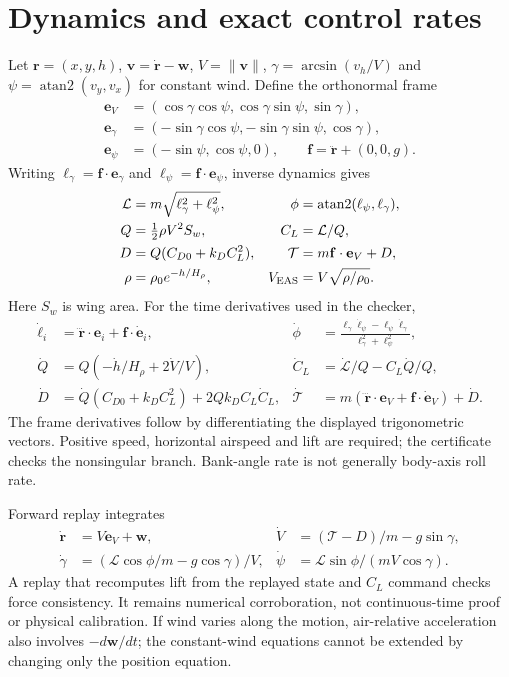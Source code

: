 \appendix
\section{Dynamics and exact control rates}\label{app:dynamics}
Let $\mathbf r=(x,y,h)$, $\mathbf v=\dot{\mathbf r}-\mathbf w$, $V=\|\mathbf v\|$, $\gamma=\arcsin(v_h/V)$ and $\psi=\operatorname{atan2}(v_y,v_x)$ for constant wind. Define the orthonormal frame
\begin{align}
\mathbf e_V&=(\cos\gamma\cos\psi,\cos\gamma\sin\psi,\sin\gamma),\\
\mathbf e_\gamma&=(-\sin\gamma\cos\psi,-\sin\gamma\sin\psi,\cos\gamma),\\
\mathbf e_\psi&=(-\sin\psi,\cos\psi,0),\qquad \mathbf f=\ddot{\mathbf r}+(0,0,g).
\end{align}
Writing $\ell_\gamma=\mathbf f\cdot\mathbf e_\gamma$ and $\ell_\psi=\mathbf f\cdot\mathbf e_\psi$, inverse dynamics gives
\begin{align}
\mathcal L&=m\sqrt{\ell_\gamma^2+\ell_\psi^2}, &\phi&=\operatorname{atan2}(\ell_\psi,\ell_\gamma),\\
Q&=\tfrac12\rho V^2S_w, & C_L&=\mathcal L/Q,\\
D&=Q(C_{D0}+k_D C_L^2), &\mathcal T&=m\mathbf f\cdot\mathbf e_V+D,\\
\rho&=\rho_0e^{-h/H_\rho}, &V_{\rm EAS}&=V\sqrt{\rho/\rho_0}.
\end{align}
Here $S_w$ is wing area. For the time derivatives used in the checker,
\begin{align}
\dot\ell_i&=\dddot{\mathbf r}\cdot\mathbf e_i+\mathbf f\cdot\dot{\mathbf e}_i,
&\dot\phi&=\frac{\ell_\gamma\dot\ell_\psi-\ell_\psi\dot\ell_\gamma}{\ell_\gamma^2+\ell_\psi^2},\\
\dot Q&=Q(-\dot h/H_\rho+2\dot V/V),
&\dot C_L&=\dot{\mathcal L}/Q-C_L\dot Q/Q,\\
\dot D&=\dot Q(C_{D0}+k_DC_L^2)+2Qk_DC_L\dot C_L,
&\dot{\mathcal T}&=m(\dddot{\mathbf r}\cdot\mathbf e_V+\mathbf f\cdot\dot{\mathbf e}_V)+\dot D.
\end{align}
The frame derivatives follow by differentiating the displayed trigonometric vectors. Positive speed, horizontal airspeed and lift are required; the certificate checks the nonsingular branch. Bank-angle rate is not generally body-axis roll rate.

Forward replay integrates
\begin{align}
\dot{\mathbf r}&=V\mathbf e_V+\mathbf w,&\dot V&=(\mathcal T-D)/m-g\sin\gamma,\\
\dot\gamma&=(\mathcal L\cos\phi/m-g\cos\gamma)/V,&
\dot\psi&=\mathcal L\sin\phi/(mV\cos\gamma).
\end{align}
A replay that recomputes lift from the replayed state and $C_L$ command checks force consistency. It remains numerical corroboration, not continuous-time proof or physical calibration. If wind varies along the motion, air-relative acceleration also involves $-d\mathbf w/dt$; the constant-wind equations cannot be extended by changing only the position equation.

